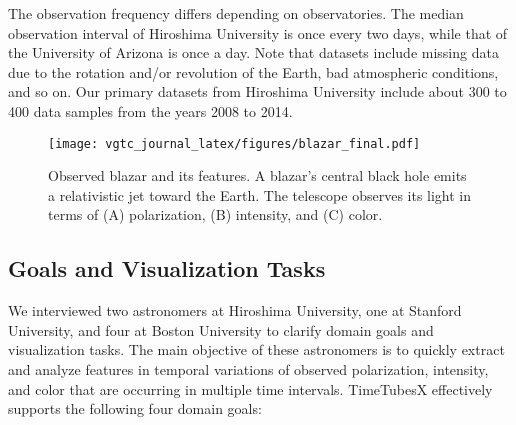 The observation frequency differs depending on observatories.
The median observation interval of Hiroshima University is once every two days,
while that of the University of Arizona is once a day.
Note that datasets include missing data due to the rotation and/or revolution of the Earth, bad atmospheric conditions, and so on.
Our primary datasets from Hiroshima University include about 300 to 400 data samples from the years 2008 to 2014. 


\begin{figure}[tb]
    \centering
        \texttt{[image: vgtc\_journal\_latex/figures/blazar\_final.pdf]}
    \caption{Observed blazar and its features. A blazar's central black hole emits a relativistic jet toward the Earth.
        The telescope observes its light in terms of (A) polarization, (B) intensity, and (C) color.}
    \label{fig:blazar}
\end{figure}

\subsection{Goals and Visualization Tasks}\label{sec:domainGoalsandTasks}
We interviewed two astronomers at Hiroshima University, one at Stanford University, and four at Boston University to clarify domain goals and visualization tasks.
The main objective of these astronomers is 
to quickly extract and analyze features in temporal variations of observed polarization, intensity, and color that are occurring in multiple time intervals. 
TimeTubesX effectively supports the following four domain goals:

